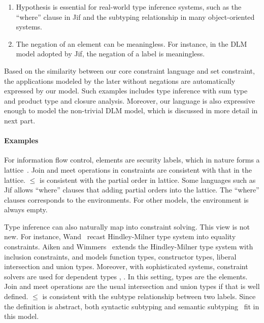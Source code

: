 \begin{enumerate}
\item Hypothesis is essential for real-world type inference systems, such as
the ``where'' clause in Jif and the subtyping relationship in many
object-oriented systems.

\item The negation of an element can be meaningless. For instance, in the DLM
model adopted by Jif, the negation of a label is meaningless.
\end{enumerate}

Based on the similarity between our core constraint language and set
constraint, the applications modeled by the later without negations are
automatically expressed by our model. Such examples includes type inference
with sum type and product type and closure analysis. Moreover, our language is
also expressive enough to model the non-trivial DLM model, which is discussed
in more detail in next part.

\paragraph{Examples}

For information flow control, elements are security labels, which in
nature forms a lattice~\cite{denning-lattice}. Join and meet
operations in constraints are consistent with that in the lattice.
$\leq$ is consistent with the partial order in lattice. Some languages
such as Jif allows ``where'' clauses that adding partial orders into
the lattice. The ``where'' clauses corresponds to the environments.
For other models, the environment is always empty.

Type inference can also naturally map into constraint solving. This
view is not new. For instance, Wand~\cite{wand-typeinference}
recast Hindley-Milner type system into equality constraints. Aiken and
Wimmers~\cite{aiken-typeinclusion} extends the Hindley-Milner type
system with inclusion constraints, and models function types,
constructor types, liberal intersection and union types. Moreover,
with sophisticated systems, constraint solvers are used for dependent
types , . In this setting, types are the
elements. Join and meet operations are the usual intersection and
union types if that is well defined.  $\leq$ is consistent with the
subtype relationship between two labels.  Since the definition is
abstract, both syntactic subtyping  and semantic
subtyping~\cite{aiken-typeinclusion} fit in this model.

